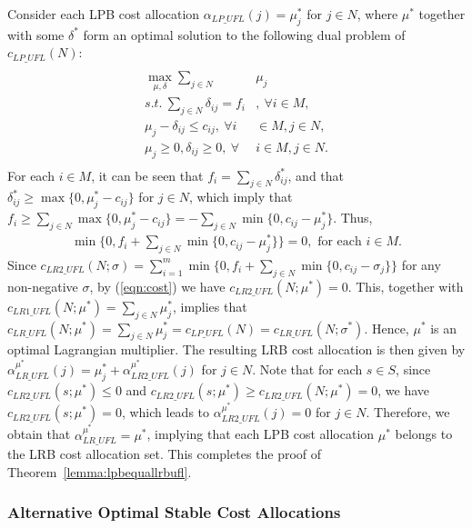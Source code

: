 \documentclass[ijoc,nonblindrev]{informs3} %
\begin{document}
Consider each LPB cost allocation  $\alpha_{LP\_UFL}(j)=\mu^*_j$ for $j \in N$, where  $\mu^*$ together with some $\delta^*$ form an optimal solution to the following dual problem of $c_{LP\_UFL}(N)$:
\begin{eqnarray*}
\begin{aligned}
\begin{split}\label{eqn:UFLLRdual1}
 \max_{\mu,\delta} \sum_{j \in N}&\mu_j\\
s.t.~\sum_{j \in N}\delta_{ij} = f_i&, ~\forall i \in M,\\
\mu_j - \delta_{ij} \leq c_{ij}, ~\forall i& \in M, j \in N,\\
 \mu_j \geq 0, \delta_{ij} \geq 0,~\forall &i \in M, j \in N.
\end{split}
\end{aligned}
\end{eqnarray*}
For each $i\in M$, it can be seen that $f_i = \sum_{j\in N}\delta^*_{ij}$, and that $\delta^*_{ij}\geq \max\{0,\mu^*_j-c_{ij}\}$ for $j \in N$, which imply that $f_i \geq \sum_{j\in N}\max\{0,\mu^*_j-c_{ij}\}=-\sum_{j\in N}\min\{0,c_{ij}-\mu^*_j\}$. Thus,
\begin{eqnarray}
  \min\{0,f_i + \sum_{j\in N}\min\{0,c_{ij}-\mu^*_j\}\} =0, \mbox{ for each $i\in M$.} \label{eqn:cost}
\end{eqnarray}
Since $c_{LR2\_UFL}(N;\sigma)=\sum_{i=1}^{m}\min\{0,f_i+\sum_{j\in N}\min\{0,c_{ij}-\sigma_{j}\}\}$ for any non-negative $\sigma$, by (\ref{eqn:cost}) we have  $c_{LR2\_UFL}(N;\mu^*) = 0$.
This, together with $c_{LR1\_UFL}(N;\mu^*)=\sum_{j\in N}\mu^*_j$, implies that $c_{LR\_UFL}(N;\mu^*) = \sum_{j\in N}\mu^*_j = c_{LP\_UFL}(N)=c_{LR\_UFL}(N;\sigma^*)$.
Hence, $\mu^*$ is an optimal Lagrangian multiplier.
The resulting LRB cost allocation is then given by $\alpha^{\mu^*}_{LR\_UFL}(j) = \mu^*_j + \alpha^{\mu^*}_{LR2\_UFL}(j)$ for $j \in N$. Note that  for each $s\in S$, since $c_{LR2\_UFL}(s;\mu^*)\leq 0$ and $c_{LR2\_UFL}(s;\mu^*)\geq c_{LR2\_UFL}(N;\mu^*)=0$, we have $c_{LR2\_UFL}(s;\mu^*)=0$, which leads to $\alpha^{\mu^*}_{LR2\_UFL}(j) = 0$ for $j\in N$.
Therefore, we obtain that $\alpha^{\mu^*}_{LR\_UFL} = \mu^*$, implying that each LPB cost allocation $\mu^*$ belongs to the LRB cost allocation set. This completes the proof of  Theorem~\ref{lemma:lpbequallrbufl}.
\hfill\Halmos


\subsubsection{Alternative Optimal Stable Cost Allocations}\label{section:uflcomputation}
\end{document}

